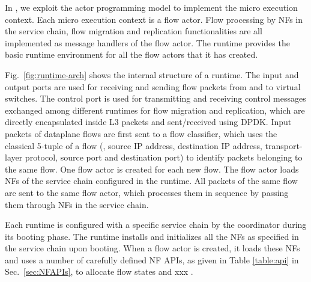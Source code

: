 In \nfactor, we exploit the actor programming model to implement the micro execution context. Each micro execution context is a flow actor. Flow processing by NFs in the service chain, flow migration and replication functionalities are all implemented as message handlers of the flow actor. The runtime provides the basic runtime environment for all the flow actors that it has created. 


Fig.~\ref{fig:runtime-arch} shows the internal structure of a runtime. The input and output ports are used for receiving and sending flow packets from and to virtual switches. The control port is used for transmitting and receiving control messages exchanged among different runtimes for flow migration and replication, which are directly encapsulated inside L3 packets and sent/received using DPDK. %
 Input packets of dataplane flows are first sent to a flow classifier, which uses the classical 5-tuple of a flow (\ie, source IP address, destination IP address, transport-layer protocol, source port and destination port) to identify packets belonging to the same flow. One flow actor is created for each new flow. The flow actor loads NFs of the service chain configured in the runtime. All packets of the same flow are sent to the same flow actor, which processes them in sequence by passing them through NFs in the service chain. 
 
Each runtime is configured with a specific service chain by the coordinator during its booting phase. The runtime installs and initializes all the NFs as specified in the service chain upon booting. When a flow actor is created, it loads these NFs and uses a number of carefully defined NF APIs, as given in Table \ref{table:api} in Sec.~\ref{sec:NFAPIs}, to allocate flow states  and xxx . 


